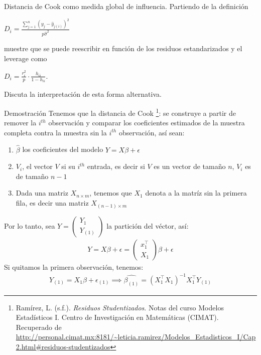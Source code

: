 \documentclass[a4paper,11pt]{article}
\begin{document}
\newpage
\begin{ejercicio}{7}
Distancia de Cook como medida global de influencia.
Partiendo de la definición

$D_i = \frac{\sum_{j=1}^{n} (y_j - \hat{y}_{j(i)})^2}{p\hat{\sigma}^2}$

muestre que se puede reescribir en función de los residuos estandarizados y el leverage
como

$D_i = \frac{r_i^2}{p} \cdot \frac{h_{ii}}{1 - h_{ii}}$.

Discuta la interpretación de esta forma alternativa.
\end{ejercicio}
\begin{demostracion}{Demostración}
    Tenemos que la distancia de Cook \footnote{Ramírez, L. (s.f.). \textit{Residuos Studentizados}. Notas del curso Modelos Estadísticos I. Centro de Investigación en Matemáticas (CIMAT). Recuperado de \url{http://personal.cimat.mx:8181/~leticia.ramirez/Modelos_Estadisticos_I/Cap2.html#residuos-studentizados}}: se construye a partir de remover la $i^{th}$ observación y comparar los coeficientes estimados de la muestra completa contra la muestra sin la $i^{th}$ observación, así sean:
    \begin{enumerate}
        \item $\hat{\beta}$ los coeficientes del modelo $Y=X\beta+\epsilon$
        \item $V_{i} $, el vector $V$ si su $i^{th} $ entrada, es decir si $V$ es un vector de tamaño $n$, $V_{i} $ es de tamaño $n-1$
        \item Dada una matriz $X_{n\times m} $, tenemos que $X_{1} $ denota a la matríz sin la primera fila, es decir una matriz  $X_{(n-1)\times m} $
        \end{enumerate}
Por lo tanto, sea $Y=\begin{pmatrix}
    Y_1\\
    Y_{(1)} 
\end{pmatrix} $ la partición del véctor, así:
\begin{align*}
    Y=X\beta+\epsilon=\begin{pmatrix}
        x_1^\top\\
        X_1
    \end{pmatrix}\beta+\epsilon
\end{align*}
Si quitamos la primera observación, tenemos:
\begin{align*}
    Y_{(1)}=X_1\beta+\epsilon_{(1)}\implies \hat{\beta_{(1)} }=\left(X_1^\top X_1 \right)^{-1}X_1^\top Y_{(1)}  
\end{align*}

\end{demostracion}
\end{document}
